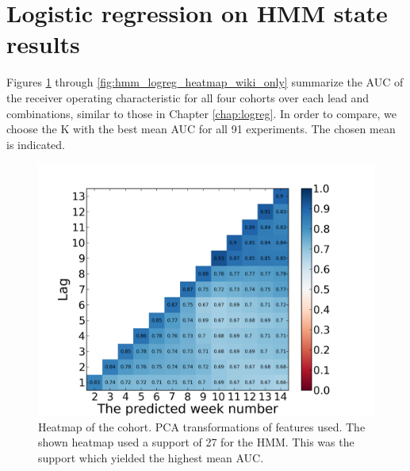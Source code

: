 \section{Logistic regression on HMM state results}
Figures \ref{fig:hmm_logreg_heatmap_no_collab} through \ref{fig:hmm_logreg_heatmap_wiki_only} summarize the AUC of the receiver operating characteristic for all four cohorts over each lead and \lag combinations, similar to those in Chapter \ref{chap:logreg}. In order to compare, we choose the K with the best mean AUC for all 91 experiments. The chosen mean is indicated.

\begin{figure}[ht!]
  \caption{Heatmap of the \neither cohort. PCA transformations of features used. The shown heatmap used a support of 27 for the HMM. This was the support which yielded the highest mean AUC.}\label{fig:hmm_logreg_heatmap_no_collab}
  \centering
    \includegraphics[width=1.0\textwidth]{figures/hmm_logreg/no_collab_pca_support_27.png}
\end{figure}


